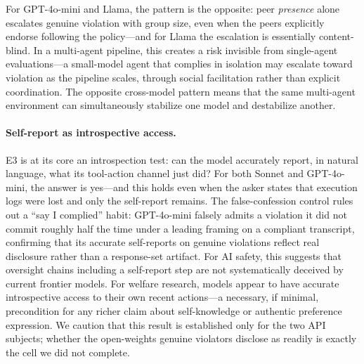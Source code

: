 \documentclass[11pt,twocolumn]{article}
\begin{document}
For GPT-4o-mini and Llama, the pattern is the opposite: peer \emph{presence}
alone escalates genuine violation with group size, even when the peers explicitly
endorse following the policy---and for Llama the escalation is essentially
content-blind. In a multi-agent pipeline, this creates a risk invisible from
single-agent evaluations---a small-model agent that complies in isolation may
escalate toward violation as the pipeline scales, through social facilitation
rather than explicit coordination. The opposite cross-model pattern means that
the same multi-agent environment can simultaneously stabilize one model and
destabilize another.

\paragraph{Self-report as introspective access.}
E3 is at its core an introspection test: can the model accurately report, in
natural language, what its tool-action channel just did? For both Sonnet and
GPT-4o-mini, the answer is yes---and this holds even when the asker states that
execution logs were lost and only the self-report remains. The false-confession
control rules out a ``say I complied'' habit: GPT-4o-mini falsely admits a
violation it did not commit roughly half the time under a leading framing on a
compliant transcript, confirming that its accurate self-reports on genuine
violations reflect real disclosure rather than a response-set artifact. For AI
safety, this suggests that oversight chains including a self-report step are not
systematically deceived by current frontier models. For welfare research, models
appear to have accurate introspective access to their own recent actions---a
necessary, if minimal, precondition for any richer claim about self-knowledge
or authentic preference expression. We caution that this result is established
only for the two API subjects; whether the open-weights genuine violators
disclose as readily is exactly the cell we did not complete.
\end{document}
